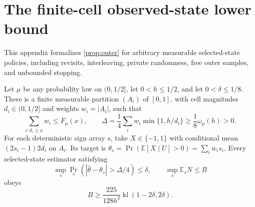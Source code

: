 \section{The finite-cell observed-state lower bound}
\label{app:finite-observed}

This appendix formalizes \cref{prop:outer} for arbitrary measurable
selected-state policies, including revisits, interleaving, private
randomness, free outer samples, and unbounded stopping.

\begin{theorem}
\label{thm:finite-observed-verified}
Let $\mu$ be any probability law on $(0,1/2]$, let $0<h\le1/2$,
and let $0<\delta\le1/8$. There is a finite measurable partition
$(A_i)$ of $[0,1]$, with cell magnitudes $d_i\in(0,1/2]$ and
weights $w_i=|A_i|$, such that
\[
 \sum_{i:d_i\le x}w_i\le F_\mu(x),\qquad
 \Delta=\frac14\sum_i w_i\min\{1,h/d_i\}
 \ge\frac18\omega_\mu(h)>0.
\]
For each deterministic sign array $s$, take
$X\in\{-1,1\}$ with conditional mean
$(2s_i-1)2d_i$ on $A_i$. Its target is
$\theta_s=\Pr(\mathbb E[X\mid U]>0)=\sum_iw_i s_i$.
Every selected-state estimator satisfying
\[
 \sup_s\Pr_s(|\widehat\theta-\theta_s|>\Delta/4)\le\delta,
 \qquad \sup_s\mathbb E_sN\le B
\]
obeys
\[
 B\ge\frac{225}{128h^2}
       \operatorname{kl}(1-2\delta,2\delta).
\]
\end{theorem}

